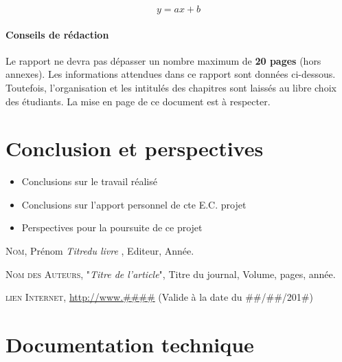 \documentclass[a4paper, 12pt]{report} %
\begin{document}
\begin{equation}
	y = a x + b
\end{equation}

				\subsubsection{Conseils de rédaction}

	Le rapport ne devra pas dépasser un nombre maximum de \textbf{20 pages} (hors annexes). Les informations attendues dans ce rapport sont données ci-dessous. Toutefois, l’organisation et les intitulés des chapitres sont laissés au libre choix des étudiants. La mise en page de ce document est à respecter. 

	\chapter*{Conclusion et perspectives}		%
\begin{itemize}
\item Conclusions sur le travail réalisé
\item Conclusions sur l’apport personnel de cte E.C. projet
\item Perspectives pour la poursuite de ce projet
\end{itemize}

\begin{thebibliography}{9}

		\textsc{Nom}, Prénom
		\textit{Titredu livre },
		Editeur, Année.

		\textsc{Nom des Auteurs},
		"\textit{Titre de l'article}",
		Titre du journal,
		Volume, pages, année.

\textsc{lien Internet},
		\url{http://www.\#\#\#\#}
		(Valide à la date du \#\#/\#\#/201\#)

\end{thebibliography}

\appendix

	\chapter{Documentation technique}
\end{document}
